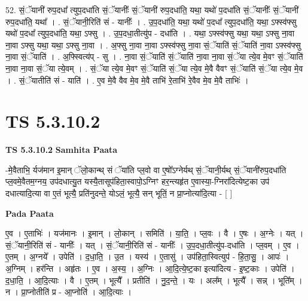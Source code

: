\documentclass[17pt]{extarticle}
\begin{document}
52. सं॒ॅयानी॑ रुप॒दधा᳚ त्युप॒दधा॑ति सं॒ॅयानीः᳚ सं॒ॅयानी॑ रुप॒दधा॑ति॒ यथा॒ यथो॑ प॒दधा॑ति सं॒ॅयानीः᳚ सं॒ॅयानी॑ रुप॒दधा॑ति॒ यथा᳚ । . सं॒ॅयानी॒रिति॑ सं - यानीः᳚ । . उ॒प॒दधा॑ति॒ यथा॒ यथो॑ प॒दधा᳚ त्युप॒दधा॑ति॒ यथा॒ ऽफ्स्व॑फ्सु यथो॑ प॒दधा᳚ त्युप॒दधा॑ति॒ यथा॒ ऽफ्सु । . उ॒प॒दधा॒तीत्यु॑प - दधा॑ति । . यथा॒ ऽफ्स्व॑फ्सु यथा॒ यथा॒ ऽफ्सु ना॒वा ना॒वा ऽफ्सु यथा॒ यथा॒ ऽफ्सु ना॒वा । . अ॒फ्सु ना॒वा ना॒वा ऽफ्स्व॑फ्सु ना॒वा सं॒ॅयाति॑ सं॒ॅयाति॑ ना॒वा ऽफ्स्व॑फ्सु ना॒वा सं॒ॅयाति॑ । . अ॒फ्स्वित्य॑प् - सु । . ना॒वा सं॒ॅयाति॑ सं॒ॅयाति॑ ना॒वा ना॒वा सं॒ॅया त्ये॒व मे॒वꣳ सं॒ॅयाति॑ ना॒वा ना॒वा सं॒ॅया त्ये॒वम् । . सं॒ॅया त्ये॒व मे॒वꣳ सं॒ॅयाति॑ सं॒ॅया त्ये॒व मे॒वै वैवꣳ सं॒ॅयाति॑ सं॒ॅया त्ये॒व मे॒व । . सं॒ॅयातीति॑ सं - याति॑ । . ए॒व मे॒वै वैव मे॒व मे॒वै ताभि॑ रे॒ताभि॑ रे॒वैव मे॒व मे॒वै ताभिः॑ । \newline
\pagebreak
{}

\section{ TS 5.3.10.2 }

\textbf{TS 5.3.10.2 } \newline
\textbf{Samhita Paata} \newline

-मे॒वैताभि॒ र्यज॑मान इ॒मान् ॅलो॒कान्थ् सं ॅया॑ति प्ल॒वो वा ए॒षो᳚ऽग्नेर्यथ् सं॒ॅयानी॒र्यथ् सं॒ॅयानी॑रुप॒दधा॑ति प्ल॒वमे॒वैतम॒ग्नय॒ उप॑दधात्यु॒त यस्यै॒तासूप॑हिता॒स्वापो॒ऽग्निꣳ हर॒न्त्यहृ॑त ए॒वास्या॒-ग्निरा॑दित्येष्ट॒का उप॑ दधात्यादि॒त्या वा ए॒तं भूत्यै॒ प्रति॑नुदन्ते॒ योऽलं॒ भूत्यै॒ सन् भूतिं॒ न प्रा॒प्नोत्या॑दि॒त्या - [  ] \newline

\textbf{Pada Paata} \newline

ए॒व । ए॒ताभिः॑ । यज॑मानः । इ॒मान् । लो॒कान् । समिति॑ । या॒ति॒ । प्ल॒वः । वै । ए॒षः । अ॒ग्नेः । यत् । सं॒ॅयानी॒रिति॑ सं - यानीः᳚ । यत् । सं॒ॅयानी॒रिति॑ सं - यानीः᳚ । उ॒प॒दधा॒तीत्यु॑प-दधा॑ति । प्ल॒वम् । ए॒व । ए॒तम् । अ॒ग्नये᳚ । उपेति॑ । द॒धा॒ति॒ । उ॒त । यस्य॑ । ए॒तासु॑ । उप॑हिता॒स्वित्युप॑ - हि॒ता॒सु॒ । आपः॑ । अ॒ग्निम् । हर॑न्ति । अहृ॑तः । ए॒व । अ॒स्य॒ । अ॒ग्निः । आ॒दि॒त्ये॒ष्ट॒का इत्या॑दित्य - इ॒ष्ट॒काः । उपेति॑ । द॒धा॒ति॒ । आ॒दि॒त्याः । वै । ए॒तम् । भूत्यै᳚ । प्रतीति॑ । नु॒द॒न्ते॒ । यः । अल᳚म् । भूत्यै᳚ । सन्न् । भूति᳚म् । न । प्रा॒प्नोतीति॑ प्र - आ॒प्नोति॑ । आ॒दि॒त्याः ।  \newline
\end{document}
